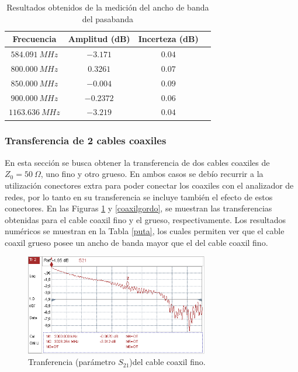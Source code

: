 \documentclass[a4paper,10pt]{article}
\begin{document}
		\begin{table}[!htp]
			\centering
			\begin{tabular}{|c|c|c|c|}
				\hline
				Frecuencia & Amplitud (dB) & Incerteza (dB)\\
				\hline
				$584.091~MHz$ & $-3.171$ & $0.04$ \\
				$800.000~MHz$ & $0.3261$ & $0.07$ \\	
				$850.000~MHz$ & $-0.004$ & $0.09$ \\	
				$900.000~MHz$ & $-0.2372$ & $0.06$ \\
				$1163.636~MHz$ & $-3.219$ & $0.04$ \\	
									
			\end{tabular}
			\caption{Resultados obtenidos de la medici\'on del ancho de banda del pasabanda} \label{tablon}
		\end{table}	
		
		
		\subsubsection{Transferencia de 2 cables coaxiles}
		\indent En esta secci\'on se  busca obtener la transferencia de dos 
		cables coaxiles de $Z_0=50~\Omega$, uno fino y otro grueso. En ambos 
		casos se deb\'io recurrir a la utilizaci\'on conectores extra para 
		poder conectar los coaxiles con el analizador de redes, por lo tanto en 
		su transferencia se incluye tambi\'en el efecto de estos conectores. En 
		las Figuras \ref{caoxilflaco} y \ref{coaxilgordo}, se muestran las 
		transferencias obtenidas para el cable coaxil fino y el grueso, 
		respectivamente. Los resultados num\'ericos se muestran en la Tabla \ref{puta}, los cuales permiten ver que el cable coaxil grueso posee un ancho de banda mayor que el del cable coaxil fino.
		

		\begin{figure}[!htb]
			\centering
			\includegraphics[width=8cm]
			{Imagenes/transferenciacablefino.png}
			\caption{Tranferencia (par\'ametro $S_{21}$)del cable coaxil 
			fino.}
			\label{caoxilflaco} 
		\end{figure}
		
\end{document}
